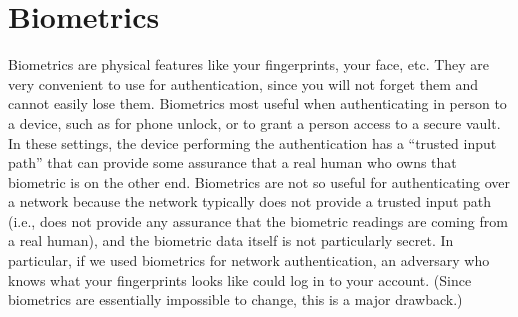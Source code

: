 \section{Biometrics}
Biometrics are physical features like your fingerprints, your face, etc.
They are very convenient to use for authentication, since you will not forget them and cannot easily lose them.
Biometrics most useful when authenticating in person to a device, such as for phone unlock, or
to grant a person access to a secure vault.
In these settings, the device performing the authentication has a ``trusted input path''
that can provide some assurance that a real human who owns that biometric is on the other end.
Biometrics are not so useful for authenticating over a network because the network typically
does not provide a trusted input path (i.e., does not provide any assurance that the biometric
readings are coming from a real human), and the biometric data itself is not particularly secret.
In particular, if we used biometrics for network authentication,
an adversary who knows what your fingerprints looks like could log in to your account.
(Since biometrics are essentially impossible to change, this is a major drawback.)
